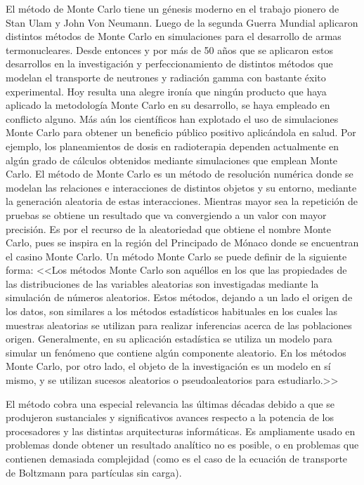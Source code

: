 \documentclass[sigconf, nonacm]{acmart}
\begin{document}
El método de Monte Carlo tiene un génesis moderno en el trabajo pionero de Stan Ulam y John Von Neumann. Luego de la segunda Guerra Mundial aplicaron distintos métodos de Monte Carlo en simulaciones para el desarrollo de armas termonucleares. Desde entonces y por más de 50 años que se aplicaron estos desarrollos en la investigación y perfeccionamiento de distintos métodos que modelan el transporte de neutrones y radiación gamma con bastante éxito experimental.
Hoy resulta una alegre ironía que ningún producto que haya aplicado la metodología Monte Carlo en su desarrollo, se haya empleado en conflicto alguno. Más aún los científicos han explotado el uso de simulaciones Monte Carlo para obtener un beneficio público positivo aplicándola en salud. Por ejemplo, los planeamientos de dosis en radioterapia dependen actualmente en algún grado de cálculos obtenidos mediante simulaciones que emplean Monte Carlo. 
El método de Monte Carlo es un método de resolución numérica donde se modelan las relaciones e interacciones de distintos objetos y su entorno, mediante la generación aleatoria de estas interacciones. Mientras mayor sea la repetición de pruebas se obtiene un resultado que va convergiendo a un valor con mayor precisión. Es por el recurso de la aleatoriedad que obtiene el nombre Monte Carlo, pues se inspira en la región del Principado de Mónaco donde se encuentran el casino Monte Carlo. 
Un método Monte Carlo se puede definir de la siguiente forma: <<Los métodos Monte Carlo son aquéllos en los que las propiedades de las distribuciones de las variables aleatorias son investigadas mediante la simulación de números aleatorios. Estos métodos, dejando a un lado el origen de los datos, son similares a los métodos estadísticos habituales en los cuales las muestras aleatorias se utilizan para realizar inferencias acerca de las poblaciones origen. Generalmente, en su aplicación estadística se utiliza un modelo para simular un fenómeno que contiene algún componente aleatorio. En los métodos Monte Carlo, por otro lado, el objeto de la investigación es un modelo en sí mismo, y se utilizan sucesos 
aleatorios o pseudoaleatorios para estudiarlo.>> 

El método cobra una especial relevancia las últimas décadas debido a que se produjeron sustanciales y significativos avances respecto a la potencia de los procesadores y las distintas arquitecturas informáticas. Es ampliamente usado en problemas donde obtener un resultado analítico no es posible, o en problemas que contienen demasiada complejidad (como es el caso de la ecuación de transporte de Boltzmann para partículas sin carga).
\end{document}
